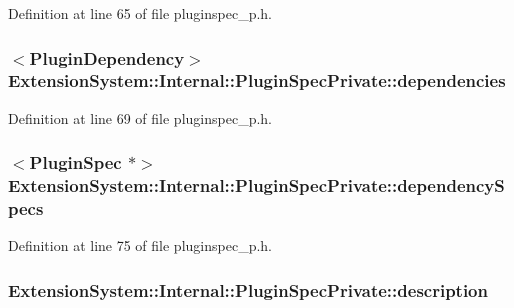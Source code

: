 Definition at line 65 of file pluginspec\-\_\-p.\-h.

\hypertarget{class_extension_system_1_1_internal_1_1_plugin_spec_private_a1f765a1f76bd2ba2f296f84289e9b44f}{
\subsubsection[{dependencies}]{$<${\bf Plugin\-Dependency}$>$ Extension\-System\-::\-Internal\-::\-Plugin\-Spec\-Private\-::dependencies}}\label{class_extension_system_1_1_internal_1_1_plugin_spec_private_a1f765a1f76bd2ba2f296f84289e9b44f}


Definition at line 69 of file pluginspec\-\_\-p.\-h.

\hypertarget{class_extension_system_1_1_internal_1_1_plugin_spec_private_abd32e8602856b2fe48fed8140846be54}{
\subsubsection[{dependency\-Specs}]{$<${\bf Plugin\-Spec} $\ast$$>$ Extension\-System\-::\-Internal\-::\-Plugin\-Spec\-Private\-::dependency\-Specs}}\label{class_extension_system_1_1_internal_1_1_plugin_spec_private_abd32e8602856b2fe48fed8140846be54}


Definition at line 75 of file pluginspec\-\_\-p.\-h.

\hypertarget{class_extension_system_1_1_internal_1_1_plugin_spec_private_a477c1550169cba561d0cede9d8dc5c2b}{
\subsubsection[{description}]{ Extension\-System\-::\-Internal\-::\-Plugin\-Spec\-Private\-::description}}\label{class_extension_system_1_1_internal_1_1_plugin_spec_private_a477c1550169cba561d0cede9d8dc5c2b}


